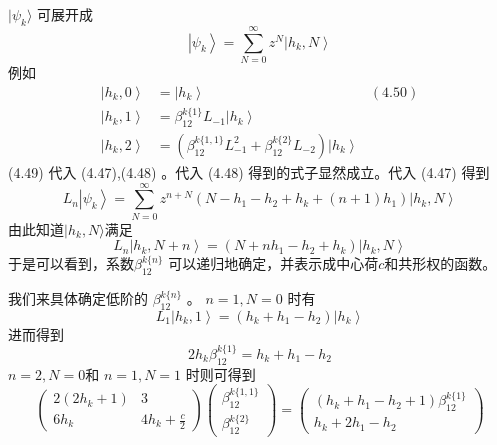$|\psi_k\rangle$ 可展开成
\begin{equation}
	\left|\psi_{k}\right\rangle=\sum_{N=0}^{\infty} z^{N}\left|h_{k}, N\right\rangle
\end{equation}
例如
\begin{align} \left|h_{k}, 0\right\rangle &=\left|h_{k}\right\rangle &(4.50)\\ \left|h_{k}, 1\right\rangle &=\beta_{12}^{k\{1\}} L_{-1}\left|h_{k}\right\rangle \\ \left|h_{k}, 2\right\rangle &=\left(\beta_{12}^{k\{1,1\}} L_{-1}^{2}+\beta_{12}^{k\{2\}} L_{-2}\right)\left|h_{k}\right\rangle  \end{align}
(4.49) 代入 (4.47),(4.48) 。代入 (4.48) 得到的式子显然成立。代入 (4.47) 得到
\begin{equation}
	L_{n}\left|\psi_{k}\right\rangle=\sum_{N=0}^{\infty} z^{n+N}\left(N-h_{1}-h_{2}+h_{k}+(n+1) h_{1}\right)\left|h_{k}, N\right\rangle
\end{equation}
由此知道$ |h_k,N\rangle $满足
\begin{equation}
	L_{n}\left|h_{k}, N+n\right\rangle=\left(N+n h_{1}-h_{2}+h_{k}\right)\left|h_{k}, N\right\rangle
\end{equation}
于是可以看到，系数$ \beta_{12}^{k\{n\}}$ 可以递归地确定，并表示成中心荷$ c $和共形权的函数。

我们来具体确定低阶的 $\beta_{12}^{k\{n\}}$ 。 $n=1,N=0$ 时有
\begin{equation}
L_{1}\left|h_{k}, 1\right\rangle=\left(h_{k}+h_{1}-h_{2}\right)\left|h_{k}\right\rangle 
\end{equation}
进而得到
\begin{equation}
	2 h_{k} \beta_{12}^{k\{1\}}=h_{k}+h_{1}-h_{2}
\end{equation}
$n=2,N=0 $和 $n=1,N=1$ 时则可得到
\begin{equation}
\left(\begin{array}{cc} 2\left(2 h_{k}+1\right) & 3 \\ 6 h_{k} & 4 h_{k}+\frac{c}{2} \end{array}\right)\left(\begin{array}{c} \beta_{12}^{k\{1,1\}} \\ \beta_{12}^{k\{2\}} \end{array}\right)=\left(\begin{array}{c} \left(h_{k}+h_{1}-h_{2}+1\right) \beta_{12}^{k\{1\}} \\ h_{k}+2 h_{1}-h_{2} \end{array}\right)
\end{equation}

